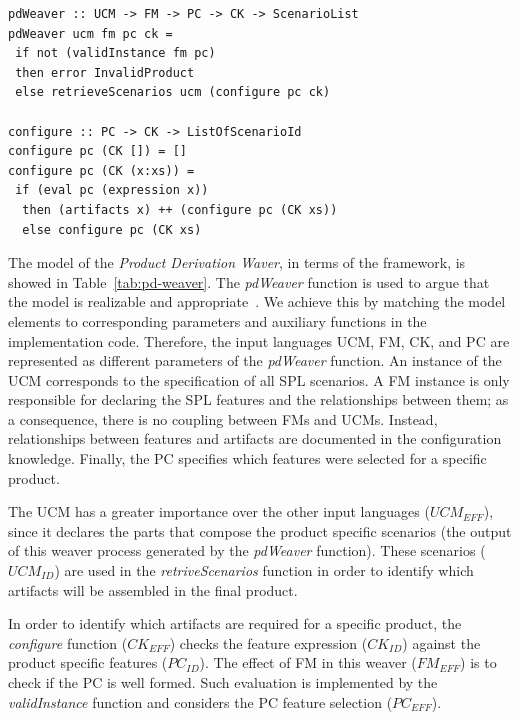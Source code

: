 \documentclass{acm_proc_article-sp}
\begin{document}
\begin{lstlisting}[belowskip=20pt,frame=tb,caption={Product derivation weaver function},label=lst:configure]
pdWeaver :: UCM -> FM -> PC -> CK -> ScenarioList
pdWeaver ucm fm pc ck = 
 if not (validInstance fm pc) 
 then error InvalidProduct
 else retrieveScenarios ucm (configure pc ck)

configure :: PC -> CK -> ListOfScenarioId
configure pc (CK []) = []
configure pc (CK (x:xs)) =
 if (eval pc (expression x))
  then (artifacts x) ++ (configure pc (CK xs))
  else configure pc (CK xs)
\end{lstlisting}

The model of the \emph{Product Derivation Waver}, 
in terms of the framework, is showed in Table~\ref{tab:pd-weaver}. The \emph{pdWeaver} function is used to argue that the model is realizable and appropriate~\cite{kiczales-ecoop-2003}. We achieve this by matching the model elements 
to corresponding parameters and auxiliary functions in the implementation code. Therefore, the input languages UCM, FM, CK, and PC are represented as different parameters 
of the \emph{pdWeaver} function. An instance of the UCM corresponds to the specification of all 
SPL scenarios. A FM instance is only responsible for declaring the SPL features and the relationships between 
them; as a consequence, there is no coupling between FMs and UCMs. Instead, relationships between features and artifacts are documented in the configuration knowledge. Finally, the PC specifies which features were selected 
for a specific product. 


The UCM has a greater importance over the other input languages ($UCM_{EFF}$), since it declares the parts that compose the product specific scenarios (the 
output of this weaver process generated by the \emph{pdWeaver} function). These scenarios ($UCM_{ID}$) are used in the \emph{retriveScenarios} function in order to identify which artifacts will be assembled in the final product.     

In order to identify which artifacts are required for a specific product, the \emph{configure} function ($CK_{EFF}$) checks the feature expression ($CK_{ID}$) against the product specific features ($PC_{ID}$). The effect of FM in this weaver ($FM_{EFF}$) is to check if the PC is well formed. Such evaluation is implemented by the \emph{validInstance} function and considers the PC feature selection ($PC_{EFF}$). 
  
\end{document}
